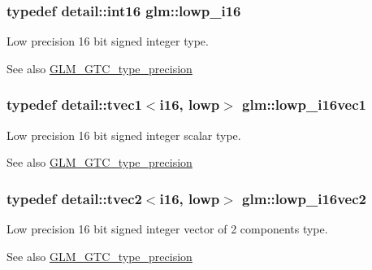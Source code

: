 \subsubsection[{\texorpdfstring{lowp\+\_\+i16}{lowp_i16}}]{\setlength{\rightskip}{0pt plus 5cm}typedef detail\+::int16 {\bf glm\+::lowp\+\_\+i16}}\hypertarget{group__gtc__type__precision_gaf7bbfd31bcec25a416ea94d09efb5451}{}\label{group__gtc__type__precision_gaf7bbfd31bcec25a416ea94d09efb5451}
Low precision 16 bit signed integer type. \begin{DoxySeeAlso}{See also}
\hyperlink{group__gtc__type__precision}{G\+L\+M\+\_\+\+G\+T\+C\+\_\+type\+\_\+precision} 
\end{DoxySeeAlso}
\subsubsection[{\texorpdfstring{lowp\+\_\+i16vec1}{lowp_i16vec1}}]{\setlength{\rightskip}{0pt plus 5cm}typedef detail\+::tvec1$<$i16, lowp$>$ {\bf glm\+::lowp\+\_\+i16vec1}}\hypertarget{group__gtc__type__precision_ga6f1e42c07424a2f14faf731c74ba2153}{}\label{group__gtc__type__precision_ga6f1e42c07424a2f14faf731c74ba2153}
Low precision 16 bit signed integer scalar type. \begin{DoxySeeAlso}{See also}
\hyperlink{group__gtc__type__precision}{G\+L\+M\+\_\+\+G\+T\+C\+\_\+type\+\_\+precision} 
\end{DoxySeeAlso}
\subsubsection[{\texorpdfstring{lowp\+\_\+i16vec2}{lowp_i16vec2}}]{\setlength{\rightskip}{0pt plus 5cm}typedef detail\+::tvec2$<$i16, lowp$>$ {\bf glm\+::lowp\+\_\+i16vec2}}\hypertarget{group__gtc__type__precision_ga47c5d4c919266799ecc76d832356feff}{}\label{group__gtc__type__precision_ga47c5d4c919266799ecc76d832356feff}
Low precision 16 bit signed integer vector of 2 components type. \begin{DoxySeeAlso}{See also}
\hyperlink{group__gtc__type__precision}{G\+L\+M\+\_\+\+G\+T\+C\+\_\+type\+\_\+precision} 
\end{DoxySeeAlso}
